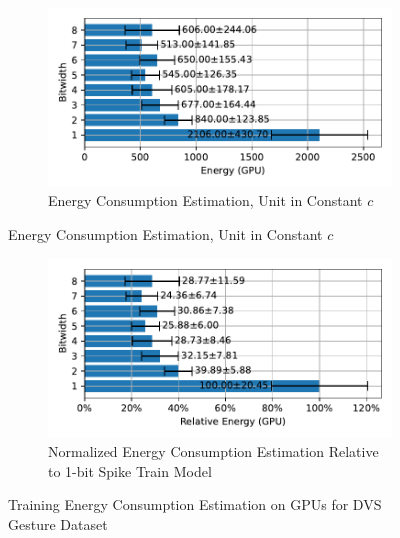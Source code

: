         \begin{figure}[H]
            \centering
            \begin{subfigure}[H]{0.6\textwidth}
                \includegraphics[width=\textwidth]{../standard/DVSGesture/plots/dvsgesture_train_energy_gpu_horizontal.pdf}
                \caption{Energy Consumption Estimation, Unit in Constant $c$}
            \end{subfigure}
        \end{figure}
        \begin{figure}[H]
            \centering
            \ContinuedFloat
            \begin{subfigure}[H]{0.6\textwidth}
                \includegraphics[width=\textwidth]{../standard/DVSGesture/plots/dvsgesture_train_relative_energy_gpu_horizontal.pdf}
                \caption{Normalized Energy Consumption Estimation Relative to 1-bit Spike Train Model}
            \end{subfigure}
            \caption{Training Energy Consumption Estimation on GPUs for DVS Gesture Dataset}
        \end{figure}

    \label{appendix:energy_gpu_cifar10}

